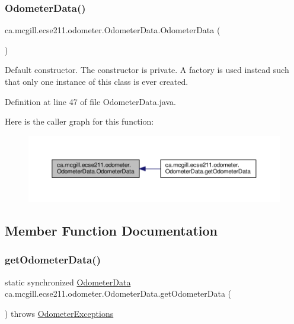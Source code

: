 \subsubsection{\texorpdfstring{Odometer\+Data()}{OdometerData()}}
{\footnotesize\ttfamily ca.\+mcgill.\+ecse211.\+odometer.\+Odometer\+Data.\+Odometer\+Data (\begin{DoxyParamCaption}{ }\end{DoxyParamCaption})\hspace{0.3cm}{\ttfamily [protected]}}

Default constructor. The constructor is private. A factory is used instead such that only one instance of this class is ever created. 

Definition at line 47 of file Odometer\+Data.\+java.

Here is the caller graph for this function\+:
\nopagebreak
\begin{figure}[H]
\begin{center}
\leavevmode
\includegraphics[width=350pt]{classca_1_1mcgill_1_1ecse211_1_1odometer_1_1_odometer_data_a91412854b75c41bf3af7c8892ec0fe87_icgraph}
\end{center}
\end{figure}


\subsection{Member Function Documentation}
\mbox{\label{classca_1_1mcgill_1_1ecse211_1_1odometer_1_1_odometer_data_afff2d760dd1f861b580f3eacef37f1cc}} 
\subsubsection{\texorpdfstring{get\+Odometer\+Data()}{getOdometerData()}}
{\footnotesize\ttfamily static synchronized \hyperlink{classca_1_1mcgill_1_1ecse211_1_1odometer_1_1_odometer_data}{Odometer\+Data} ca.\+mcgill.\+ecse211.\+odometer.\+Odometer\+Data.\+get\+Odometer\+Data (\begin{DoxyParamCaption}{ }\end{DoxyParamCaption}) throws \hyperlink{classca_1_1mcgill_1_1ecse211_1_1odometer_1_1_odometer_exceptions}{Odometer\+Exceptions}\hspace{0.3cm}{\ttfamily [static]}}

